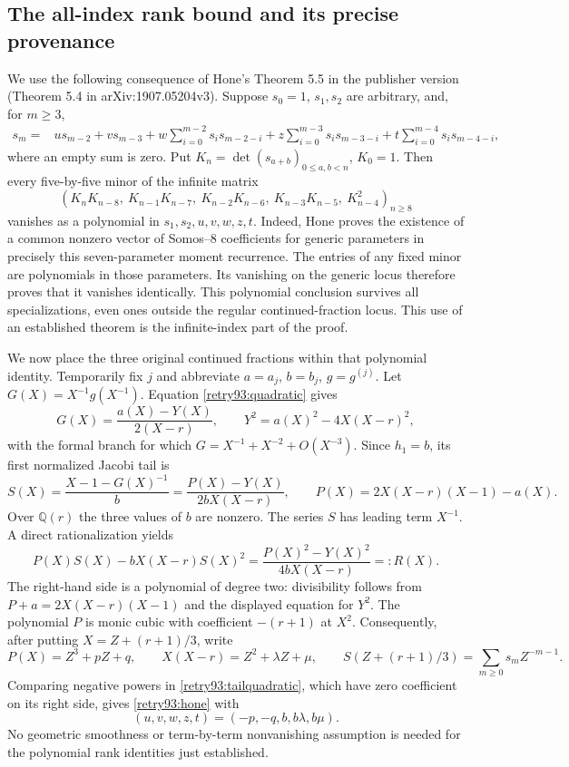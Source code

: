 \documentclass[11pt,a4paper]{article}
\theoremstyle{definition}
\theoremstyle{remark}
\begin{document}
\subsection{The all-index rank bound and its precise provenance}
We use the following consequence of Hone's Theorem 5.5 in the publisher
version (Theorem 5.4 in arXiv:1907.05204v3). Suppose $s_0=1$,
$s_1,s_2$ are arbitrary, and, for $m\ge3$,
\begin{align}\label{retry93:hone}
 s_m={}&u s_{m-2}+v s_{m-3}
 +w\sum_{i=0}^{m-2}s_i s_{m-2-i}
 +z\sum_{i=0}^{m-3}s_i s_{m-3-i}
 +t\sum_{i=0}^{m-4}s_i s_{m-4-i},
\end{align}
where an empty sum is zero. Put
$K_n=\det(s_{a+b})_{0\le a,b<n}$, $K_0=1$.
Then every five-by-five minor of the infinite matrix
\begin{equation}\label{retry93:rankmatrix}
 \left(K_nK_{n-8},\ K_{n-1}K_{n-7},\ K_{n-2}K_{n-6},\
 K_{n-3}K_{n-5},\ K_{n-4}^2\right)_{n\ge8}
\end{equation}
vanishes as a polynomial in $s_1,s_2,u,v,w,z,t$.
Indeed, Hone proves the existence of a common nonzero vector of Somos--8
coefficients for generic parameters in precisely this seven-parameter
moment recurrence. The entries of any fixed minor are polynomials in
those parameters. Its vanishing on the generic locus therefore proves
that it vanishes identically. This polynomial conclusion survives all
specializations, even ones outside the regular continued-fraction locus.
This use of an established theorem is the infinite-index part of the proof.

We now place the three original continued fractions within that polynomial
identity. Temporarily fix $j$ and abbreviate $a=a_j$, $b=b_j$, $g=g^{(j)}$.
Let $G(X)=X^{-1}g(X^{-1})$. Equation \eqref{retry93:quadratic} gives
\[
 G(X)=\frac{a(X)-Y(X)}{2(X-r)},\qquad
 Y^2=a(X)^2-4X(X-r)^2,
\]
with the formal branch for which $G=X^{-1}+X^{-2}+O(X^{-3})$.
Since $h_1=b$, its first normalized Jacobi tail is
\begin{equation}\label{retry93:tail}
 S(X)=\frac{X-1-G(X)^{-1}}{b}
      =\frac{P(X)-Y(X)}{2bX(X-r)},\qquad
 P(X)=2X(X-r)(X-1)-a(X).
\end{equation}
Over $\mathbb Q(r)$ the three values of $b$ are nonzero. The series $S$
has leading term $X^{-1}$. A direct rationalization yields
\begin{equation}\label{retry93:tailquadratic}
 P(X)S(X)-bX(X-r)S(X)^2
 =\frac{P(X)^2-Y(X)^2}{4bX(X-r)}=:R(X).
\end{equation}
The right-hand side is a polynomial of degree two: divisibility follows
from $P+a=2X(X-r)(X-1)$ and the displayed equation for $Y^2$.
The polynomial $P$ is monic cubic with coefficient $-(r+1)$ at $X^2$.
Consequently, after putting $X=Z+(r+1)/3$, write
\[
 P(X)=Z^3+pZ+q,\qquad X(X-r)=Z^2+\lambda Z+\mu,
 \qquad S(Z+(r+1)/3)=\sum_{m\ge0}s_mZ^{-m-1}.
\]
Comparing negative powers in \eqref{retry93:tailquadratic}, which have zero
coefficient on its right side, gives \eqref{retry93:hone} with
\[
 (u,v,w,z,t)=(-p,-q,b,b\lambda,b\mu).
\]
No geometric smoothness or term-by-term nonvanishing assumption is needed
for the polynomial rank identities just established.
\end{document}
